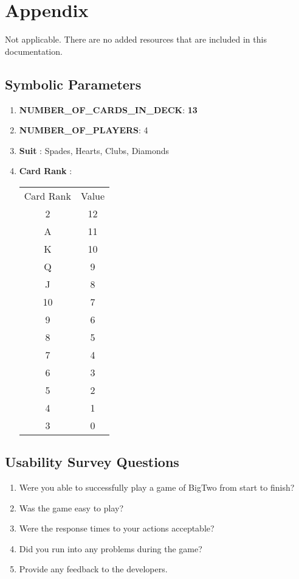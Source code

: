 \documentclass[12pt, titlepage]{article}
\begin{document}
\section{Appendix}

Not applicable. There are no added resources that are included in this documentation.

\subsection{Symbolic Parameters}

\begin{enumerate}
\item \textbf{NUMBER\_OF\_CARDS\_IN\_DECK}: \textbf{13}
\item \textbf{NUMBER\_OF\_PLAYERS}: 4
\item \textbf{Suit} : Spades, Hearts, Clubs, Diamonds
\item \textbf{Card Rank} : 
\begin{tabular}{c|c}
       Card Rank & Value \\
       2  & 12\\
       A & 11\\
       K & 10\\
       Q & 9\\
       J & 8\\
       10 & 7\\
       9 & 6\\
       8 & 5\\
       7 & 4\\
       6 & 3\\
       5 & 2\\
       4 & 1\\
       3 & 0\\
\end{tabular}
\end{enumerate}


\subsection{Usability Survey Questions}

\begin{enumerate}
\item Were you able to successfully play a game of BigTwo from start to finish? 
\item Was the game easy to play?
\item Were the response times to your actions acceptable?
\item Did you run into any problems during the game?
\item Provide any feedback to the developers.
\end{enumerate}
\end{document}
